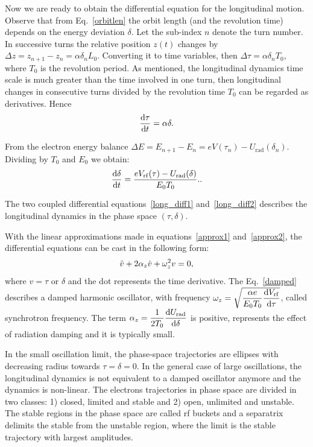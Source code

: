 Now we are ready to obtain the differential equation for the longitudinal motion. Observe that from Eq.~\eqref{orbitlen} the orbit length (and the revolution time) depends on the energy deviation $\delta$. Let the sub-index $n$ denote the turn number. In successive turns the relative position $z(t)$ changes by $\Delta z = z_{n+1} - z_n = \alpha\delta_n L_0$. Converting it to time variables, then $\Delta \tau = \alpha \delta_n T_0$, where $T_0$ is the revolution period. As mentioned, the longitudinal dynamics time scale is much greater than the time involved in one turn, then longitudinal changes in consecutive turns divided by the revolution time $T_0$ can be regarded as derivatives. Hence
\begin{equation}
    \dfrac{\mathrm{d} \tau}{\mathrm{d} t} = \alpha \delta.
    \label{long_diff1}
\end{equation}

From the electron energy balance $\Delta E = E_{n+1} - E_n = eV(\tau_n) - U_{\mathrm{rad}}(\delta_n)$. Dividing by $T_0$ and $E_0$ we obtain:
\begin{equation}
    \dfrac{\mathrm{d} \delta}{\mathrm{d} t} = \dfrac{eV_{\mathrm{rf}}(\tau) - U_{\mathrm{rad}}(\delta)}{E_0 T_0}.
    \label{long_diff2}.
\end{equation}

The two coupled differential equations~\eqref{long_diff1} and~\eqref{long_diff2} describes the longitudinal dynamics in the phase space $(\tau, \delta)$.

With the linear approximations made in equations~\eqref{approx1} and~\eqref{approx2}, the differential equations can be cast in the following form:
\begin{equation}
    \Ddot{v} + 2\alpha_{z} \dot{v} + \omega_{z}^2 v = 0,
    \label{damped}
\end{equation}
where $v=\tau$ or $\delta$ and the dot represents the time derivative. The Eq.~\eqref{damped} describes a damped harmonic oscillator, with frequency $\omega_z = \sqrt{\dfrac{\alpha e}{E_0 T_0} \dfrac{\mathrm{d} V_{\mathrm{rf}}}{\mathrm{d} \tau}}$, called synchrotron frequency. The term $\alpha_z = \dfrac{1}{2T_0} \dfrac{\mathrm{d} U_{\mathrm{rad}}}{\mathrm{d} \delta}$ is positive, represents the effect of radiation damping and it is typically small. 

In the small oscillation limit, the phase-space trajectories are ellipses with decreasing radius towards $\tau = \delta = 0$. In the general case of large oscillations, the longitudinal dynamics is not equivalent to a damped oscillator anymore and the dynamics is non-linear. The electrons trajectories in phase space are divided in two classes: 1) closed, limited and stable and 2) open, unlimited and unstable. The stable regions in the phase space are called \gls{rf} buckets and a separatrix delimits the stable from the unstable region, where the limit is the stable trajectory with largest amplitudes.


